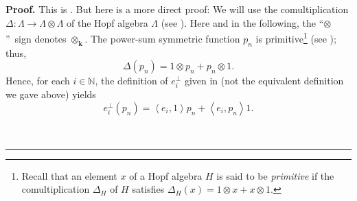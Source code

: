 \documentclass[numbers=enddot,12pt,final,onecolumn,notitlepage]{scrartcl}%
\theoremstyle{definition}
\newenvironment{proof}[1][Proof]{\noindent\textbf{#1.} }{\ \rule{0.5em}{0.5em}}
\begin{document}
\begin{proof}
This is \cite[Exercise 2.9.1(f)]{GriRei}. But here is a more direct proof: We
will use the comultiplication $\Delta:\Lambda\rightarrow\Lambda\otimes\Lambda$
of the Hopf algebra $\Lambda$ (see \cite[\S 2.3]{GriRei}). Here and in the
following, the \textquotedblleft$\otimes$\textquotedblright\ sign denotes
$\otimes_{\mathbf{k}}$. The power-sum symmetric function $p_{n}$ is
primitive\footnote{Recall that an element $x$ of a Hopf algebra $H$ is said to
be \textit{primitive} if the comultiplication $\Delta_{H}$ of $H$ satisfies
$\Delta_{H}\left(  x\right)  =1\otimes x+x\otimes1$.} (see \cite[Proposition
2.3.6(i)]{GriRei}); thus,
\[
\Delta\left(  p_{n}\right)  =1\otimes p_{n}+p_{n}\otimes1.
\]
Hence, for each $i\in\mathbb{N}$, the definition of $e_{i}^{\perp}$ given in
\cite[Definition 2.8.1]{GriRei} (not the equivalent definition we gave above)
yields%
\begin{equation}
e_{i}^{\perp}\left(  p_{n}\right)  =\left\langle e_{i},1\right\rangle
p_{n}+\left\langle e_{i},p_{n}\right\rangle 1. \label{pf.lem.Bmpn.eipn}%
\end{equation}



\end{proof}
\end{document}
